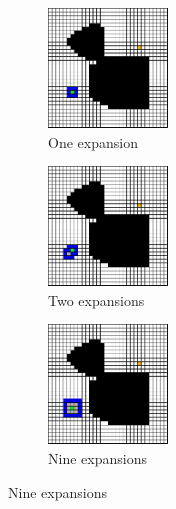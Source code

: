 \begin{figure}
  \begin{center}
    \begin{subfigure}[t]{0.3\textwidth}
      \includegraphics[width=1.25in]{planning/figs/bfs_0001.pdf}
       \caption{One expansion}
    \end{subfigure}
    \begin{subfigure}[t]{0.3\textwidth}
      \includegraphics[width=1.25in]{planning/figs/bfs_0002.pdf}
       \caption{Two expansions}
    \end{subfigure}
    \begin{subfigure}[t]{0.3\textwidth}
      \includegraphics[width=1.25in]{planning/figs/bfs_0009.pdf}
       \caption{Nine expansions}
    \end{subfigure}

    \vspace{.2in}


\end{center}
\end{figure}
